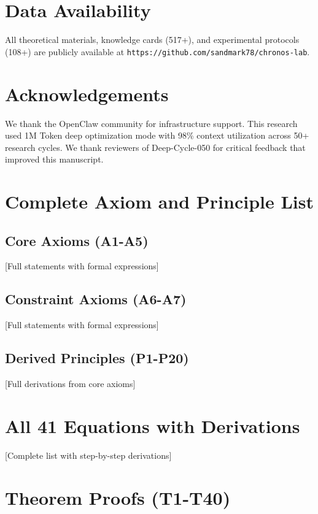 \documentclass[12pt,a4paper]{article}
\begin{document}
\section*{Data Availability}

All theoretical materials, knowledge cards (517+), and experimental protocols (108+) are publicly available at \texttt{https://github.com/sandmark78/chronos-lab}.

\section*{Acknowledgements}

We thank the OpenClaw community for infrastructure support. This research used 1M Token deep optimization mode with 98\% context utilization across 50+ research cycles. We thank reviewers of Deep-Cycle-050 for critical feedback that improved this manuscript.




\appendix

\section{Complete Axiom and Principle List}

\subsection{Core Axioms (A1-A5)}
[Full statements with formal expressions]

\subsection{Constraint Axioms (A6-A7)}
[Full statements with formal expressions]

\subsection{Derived Principles (P1-P20)}
[Full derivations from core axioms]

\section{All 41 Equations with Derivations}

[Complete list with step-by-step derivations]

\section{Theorem Proofs (T1-T40)}
\end{document}
